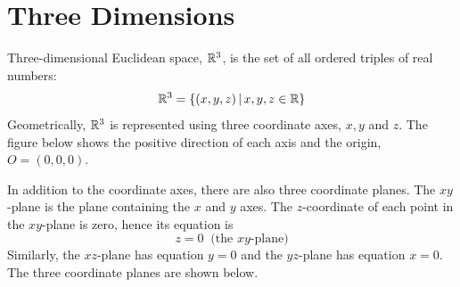 \documentclass[handout]{ximera}
\begin{document}
\section{Three Dimensions}
Three-dimensional Euclidean space, $\mathbb R^3$, is the set of all ordered triples of real numbers:
\[
\mathbb R^3 = \{(x,y,z)\,|\, x,y,z \in \mathbb R \}
\]
Geometrically, $\mathbb R^3$ is represented using three coordinate axes, $x, y$ and $z$.
The figure below shows the positive direction of each axis and the origin, $O = (0,0,0)$.
\begin{image}
\end{image}
In addition to the coordinate axes, there are also three coordinate planes.  
The $xy$-plane is the plane containing the $x$ and $y$ axes.  
The $z$-coordinate of each point in the $xy$-plane is zero, hence its equation is
\[
z = 0 \;\; \text{(the $xy$-plane)}
\]
Similarly, the $xz$-plane has equation $y = 0$ and the $yz$-plane has equation $x=0$.
The three coordinate planes are shown below.
\begin{image}
\end{image}
\end{document}

